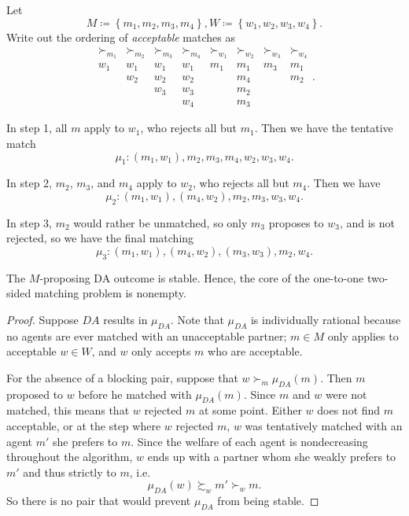 \begin{example}
	Let \[
		M\coloneqq \left\{m_1,m_2,m_3,m_4\right\}, W \coloneqq \left\{w_1,w_2,w_3,w_4\right\}
	.\] Write out the ordering of \emph{acceptable} matches as \[
		\begin{array}{cccc|cccc}
			\succ_{m_1} & \succ_{m_2} & \succ_{m_3} & \succ_{m_4} & \succ_{w_1} & \succ_{w_2} & \succ_{w_3} & \succ_{w_4} \\
			\hline
			w_1 & w_1 & w_1 & w_1 & m_1 & m_1 & m_3 & m_1 \\
			    & w_2 & w_2 & w_2 &     & m_4 &     & m_2 \\
			    &     & w_3 & w_3 &     & m_2 &     &     \\
			    &     &     & w_4 &     & m_3 &     &
		\end{array}
	.\]

	In step 1, all $m$ apply to $w_1$, who rejects all but $m_1$. Then we have the tentative match \[
		\mu_1: \left( m_1,w_1 \right),m_2,m_3,m_4,w_2,w_3,w_4
	.\] 

	In step 2, $m_2$, $m_3$, and $m_4$ apply to $w_2$, who rejects all but $m_4$. Then we have \[
		\mu_2: \left( m_1,w_1 \right), \left( m_4,w_2 \right), m_2, m_3, w_3,w_4
	.\] 

	In step 3, $m_2$ would rather be unmatched, so only $m_3$ proposes to $w_3$, and is not rejected, so we have the final matching \[
		\mu_3: \left( m_1,w_1 \right), \left( m_4,w_2 \right), \left( m_3,w_3 \right), m_2,w_4
	.\]
\end{example}

\begin{proposition}
	The $M$-proposing DA outcome is stable.
	Hence, the core of the one-to-one two-sided matching problem is nonempty.
\end{proposition}
\begin{proof}
	Suppose $DA$ results in $\mu_{DA}$.
	Note that $\mu_{DA}$ is individually rational because no agents are ever matched with an unacceptable partner; $m \in M$ only applies to acceptable $w\in W$, and $w$ only accepts $m$ who are acceptable.

	For the absence of a blocking pair, suppose that $w \succ_m \mu_{DA}(m)$.
	Then $m$ proposed to $w$ before he matched with $\mu_{DA}(m)$.
	Since $m$ and $w$ were not matched, this means that $w$ rejected $m$ at some point. Either $w$ does not find $m$ acceptable, or at the step where $w$ rejected $m$, 
	$w$ was tentatively matched with an agent $m'$ she prefers to $m$. Since the welfare of each agent is nondecreasing throughout the algorithm, $w$ ends up with a partner whom she weakly prefers to $m'$ and thus strictly to $m$, i.e. \[
		\mu_{DA}(w) \succsim_w m' \succ_w m
	.\]
	So there is no pair that would prevent $\mu_{DA}$ from being stable.
\end{proof}


